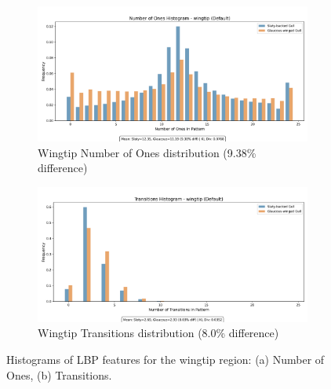 \documentclass[a4paper,12pt]{report}
\begin{document}
\begin{figure}[H]
    \centering
    \begin{subfigure}[b]{0.49\textwidth}
        \includegraphics[width=\textwidth]{images/LBP/default_wingtip_ones_histogram.png}
        \caption{Wingtip Number of Ones distribution (9.38\% difference)}
        \label{fig:wingtip_ones}
    \end{subfigure}
    \hfill
    \begin{subfigure}[b]{0.49\textwidth}
        \includegraphics[width=\textwidth]{images/LBP/default_wingtip_transitions_histogram.png}
        \caption{Wingtip Transitions distribution (8.0\% difference)}
        \label{fig:wingtip_transitions}
    \end{subfigure}
    \caption{Histograms of LBP features for the wingtip region: (a) Number of Ones, (b) Transitions.}
    \label{fig:wingtip_feature_histograms}
\end{figure}
\end{document}
